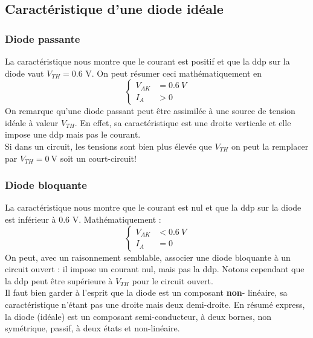 		\subsection{Caractéristique d'une diode idéale}
			\subsubsection{Diode passante}
			La caractéristique nous montre que le courant est positif et que la 
			ddp sur la diode vaut $V_{TH} = 0.6$ V. On peut résumer ceci 
			mathématiquement en
			\begin{equation}
			\left\{\begin{array}{ll}
			V_{AK} &= 0.6\ V\\
			I_A &> 0
			\end{array}\right.
			\end{equation}
			On remarque qu'une diode passant peut être assimilée à une source de 
			tension idéale à valeur $V_{TH}$. En effet, sa caractéristique est une 
			droite verticale et elle impose une ddp mais pas le courant.\\
			Si dans un circuit, les tensions sont bien plus élevée que $V_{TH}$ on 
			peut la remplacer par $V_{TH}=\SI{0}{\volt}$ soit un court-circuit!
			
			\subsubsection{Diode bloquante}
			La caractéristique nous montre que le courant est nul et que la ddp sur 
			la diode est inférieur à 0.6 V. Mathématiquement :
			\begin{equation}
			\left\{\begin{array}{ll}
			V_{AK} &< 0.6\ V\\
			I_A &= 0
			\end{array}\right.
			\end{equation}	
			On peut, avec un raisonnement semblable, associer une diode bloquante à
			un circuit ouvert : il impose un courant nul, mais pas la ddp. Notons 
			cependant que la ddp peut être supérieure à $V_{TH}$ pour le circuit 
			ouvert.\\
			
		Il faut bien garder à l'esprit que la diode est un composant \textbf{non}-
		linéaire, sa caractéristique n'étant pas une droite mais deux demi-droite. 
		En résumé express, la diode (idéale) est un composant semi-conducteur, à deux
		bornes, non symétrique, passif, à deux états et non-linéaire.
		
